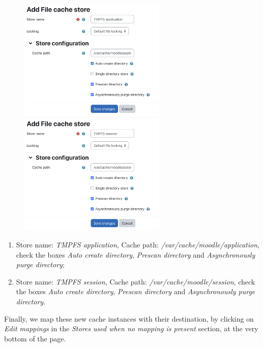 \documentclass[12pt]{article}
\begin{document}
\begin{figure}[!ht]
\hspace{\fill}
\begin{minipage}[b]{0.45\linewidth} %
\centering
\includegraphics[width=7cm]{cache-application.png}
\end{minipage}
\hspace{\fill} %
\begin{minipage}[b]{0.45\linewidth}
\centering
\includegraphics[width=7cm]{cache-session.png}
\end{minipage}
\hspace{\fill}
\end{figure}

\begin{enumerate}
\item Store name: \emph{TMPFS application}, Cache path: \emph{/var/cache/moodle/application}, check the boxes \emph{Auto create directory}, \emph{Prescan directory} and \emph{Asynchronously purge directory};
\item Store name: \emph{TMPFS session}, Cache path: \emph{/var/cache/moodle/session}, check the boxes \emph{Auto create directory}, \emph{Prescan directory} and \emph{Asynchronously purge directory}.
\end{enumerate}

Finally, we map these new cache instances with their destination, by clicking on \emph{Edit mappings} in the \emph{Stores used when no mapping is present} section, at the very bottom of the page.
\end{document}
